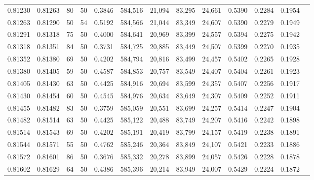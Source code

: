 \begin{tabular}{rrrrrrrrrrrrr}
0.81230 & 0.81263 &    80 &  50 &                                     0.3846 & 584,516 &  21,094 &  83,295 &  24,661 & 0.5390 & 0.2284 & 0.1954 \\
0.81263 & 0.81290 &    50 &  54 &                                     0.5192 & 584,566 &  21,044 &  83,349 &  24,607 & 0.5390 & 0.2279 & 0.1949 \\
0.81291 & 0.81318 &    75 &  50 &                                     0.4000 & 584,641 &  20,969 &  83,399 &  24,557 & 0.5394 & 0.2275 & 0.1942 \\
0.81318 & 0.81351 &    84 &  50 &                                     0.3731 & 584,725 &  20,885 &  83,449 &  24,507 & 0.5399 & 0.2270 & 0.1935 \\
0.81352 & 0.81380 &    69 &  50 &                                     0.4202 & 584,794 &  20,816 &  83,499 &  24,457 & 0.5402 & 0.2265 & 0.1928 \\
0.81380 & 0.81405 &    59 &  50 &                                     0.4587 & 584,853 &  20,757 &  83,549 &  24,407 & 0.5404 & 0.2261 & 0.1923 \\
0.81405 & 0.81430 &    63 &  50 &                                     0.4425 & 584,916 &  20,694 &  83,599 &  24,357 & 0.5407 & 0.2256 & 0.1917 \\
0.81430 & 0.81454 &    60 &  50 &                                     0.4545 & 584,976 &  20,634 &  83,649 &  24,307 & 0.5409 & 0.2252 & 0.1911 \\
0.81455 & 0.81482 &    83 &  50 &                                     0.3759 & 585,059 &  20,551 &  83,699 &  24,257 & 0.5414 & 0.2247 & 0.1904 \\
0.81482 & 0.81514 &    63 &  50 &                                     0.4425 & 585,122 &  20,488 &  83,749 &  24,207 & 0.5416 & 0.2242 & 0.1898 \\
0.81514 & 0.81543 &    69 &  50 &                                     0.4202 & 585,191 &  20,419 &  83,799 &  24,157 & 0.5419 & 0.2238 & 0.1891 \\
0.81544 & 0.81571 &    55 &  50 &                                     0.4762 & 585,246 &  20,364 &  83,849 &  24,107 & 0.5421 & 0.2233 & 0.1886 \\
0.81572 & 0.81601 &    86 &  50 &                                     0.3676 & 585,332 &  20,278 &  83,899 &  24,057 & 0.5426 & 0.2228 & 0.1878 \\
0.81602 & 0.81629 &    64 &  50 &                                     0.4386 & 585,396 &  20,214 &  83,949 &  24,007 & 0.5429 & 0.2224 & 0.1872 \\

\end{tabular}
